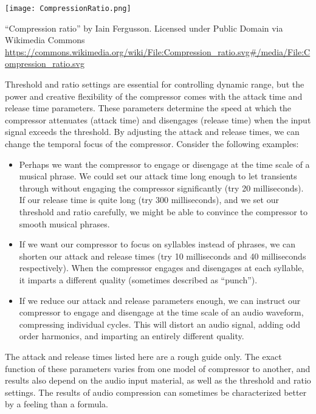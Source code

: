 \begin{marginfigure}
  \texttt{[image: CompressionRatio.png]}
  \caption{``Compression ratio'' by Iain Fergusson. Licensed under
     Public Domain via Wikimedia Commons 
     \url{https://commons.wikimedia.org/wiki/File:Compression_ratio.svg\#/media/File:Compression_ratio.svg}
   }
  \label{fig:comp-ratio}
\end{marginfigure}

Threshold and ratio settings are essential for controlling dynamic
range, but the power and creative flexibility of the compressor comes
with the attack time and release time parameters. These parameters
determine the speed at which the compressor attenuates (attack time)
and disengages (release time) when the input signal exceeds the
threshold. By adjusting the attack and release times, we can change
the temporal focus of the compressor. Consider the following examples:
\begin{itemize}
\item Perhaps we want the compressor to engage or disengage at the
  time scale of a musical phrase. We could set our attack time long
  enough to let transients through without engaging the compressor
  significantly (try 20 milliseconds). If our release time is quite
  long (try 300 milliseconds), and we set our threshold and ratio
  carefully, we might be able to convince the compressor to smooth
  musical phrases.
\item If we want our compressor to focus on syllables instead of
  phrases, we can shorten our attack and release times (try 10
  milliseconds and 40 milliseconds respectively). When the compressor
  engages and disengages at each syllable, it imparts a different
  quality (sometimes described as ``punch'').
\item If we reduce our attack and release parameters enough, we can
  instruct our compressor to engage and disengage at the time scale of
  an audio waveform, compressing individual cycles. This will distort
  an audio signal, adding odd order harmonics, and imparting an entirely different quality.
\end{itemize}
The attack and release times listed here are a rough guide only.  The
exact function of these parameters varies from one model of compressor
to another, and results also depend on the audio input material, as
well as the threshold and ratio settings. The results of audio
compression can sometimes be characterized better by a feeling than a
formula.

